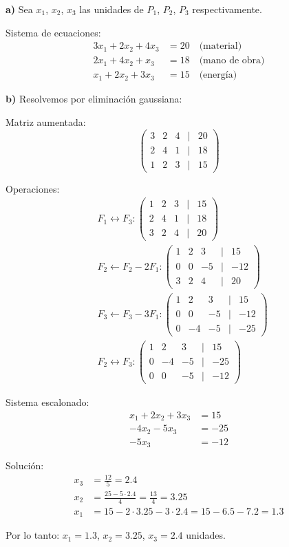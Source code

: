 \documentclass[11pt]{article}
\begin{document}
\begin{tcolorbox}[colback=green1!10, colframe=green1, title=Solución]
\textbf{a)} Sea $x_1$, $x_2$, $x_3$ las unidades de $P_1$, $P_2$, $P_3$ respectivamente.

Sistema de ecuaciones:
\begin{align*}
3x_1 + 2x_2 + 4x_3 &= 20 \quad \text{(material)} \\
2x_1 + 4x_2 + x_3 &= 18 \quad \text{(mano de obra)} \\
x_1 + 2x_2 + 3x_3 &= 15 \quad \text{(energía)}
\end{align*}

\textbf{b)} Resolvemos por eliminación gaussiana:

Matriz aumentada:
\[
\begin{pmatrix}
3 & 2 & 4 & | & 20 \\
2 & 4 & 1 & | & 18 \\
1 & 2 & 3 & | & 15
\end{pmatrix}
\]

Operaciones:
\begin{align*}
& F_1 \leftrightarrow F_3: \begin{pmatrix}1 & 2 & 3 & | & 15 \\ 2 & 4 & 1 & | & 18 \\ 3 & 2 & 4 & | & 20\end{pmatrix} \\
& F_2 \leftarrow F_2 - 2F_1: \begin{pmatrix}1 & 2 & 3 & | & 15 \\ 0 & 0 & -5 & | & -12 \\ 3 & 2 & 4 & | & 20\end{pmatrix} \\
& F_3 \leftarrow F_3 - 3F_1: \begin{pmatrix}1 & 2 & 3 & | & 15 \\ 0 & 0 & -5 & | & -12 \\ 0 & -4 & -5 & | & -25\end{pmatrix} \\
& F_2 \leftrightarrow F_3: \begin{pmatrix}1 & 2 & 3 & | & 15 \\ 0 & -4 & -5 & | & -25 \\ 0 & 0 & -5 & | & -12\end{pmatrix}
\end{align*}

Sistema escalonado:
\begin{align*}
x_1 + 2x_2 + 3x_3 &= 15 \\
-4x_2 - 5x_3 &= -25 \\
-5x_3 &= -12
\end{align*}

Solución:
\begin{align*}
x_3 &= \frac{12}{5} = 2.4 \\
x_2 &= \frac{25 - 5\cdot 2.4}{4} = \frac{13}{4} = 3.25 \\
x_1 &= 15 - 2\cdot 3.25 - 3\cdot 2.4 = 15 - 6.5 - 7.2 = 1.3
\end{align*}

Por lo tanto: $x_1 = 1.3$, $x_2 = 3.25$, $x_3 = 2.4$ unidades.
\end{tcolorbox}
\end{document}
